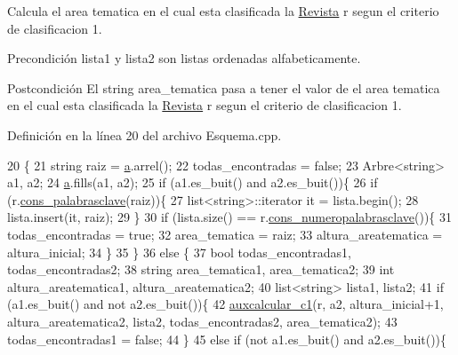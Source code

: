 Calcula el area tematica en el cual esta clasificada la \hyperlink{class_revista}{Revista} r segun el criterio de clasificacion 1. 

\begin{DoxyPrecond}{Precondición}
lista1 y lista2 son listas ordenadas alfabeticamente. 
\end{DoxyPrecond}
\begin{DoxyPostcond}{Postcondición}
El string area\-\_\-tematica pasa a tener el valor de el area tematica en el cual esta clasificada la \hyperlink{class_revista}{Revista} r segun el criterio de clasificacion 1. 
\end{DoxyPostcond}


Definición en la línea 20 del archivo Esquema.\-cpp.


\begin{DoxyCode}
20                                                                                                            
                                                                      \{
21     \textcolor{keywordtype}{string} raiz = \hyperlink{class_esquema_aee89f1d564d1951112b2f10a47f943aa}{a}.arrel();
22     todas\_encontradas = \textcolor{keyword}{false};
23     Arbre<string> a1, a2;
24     \hyperlink{class_esquema_aee89f1d564d1951112b2f10a47f943aa}{a}.fills(a1, a2);
25     \textcolor{keywordflow}{if} (a1.es\_buit() and a2.es\_buit())\{
26   \textcolor{keywordflow}{if} (r.\hyperlink{class_revista_aad8d277011c68f7acdeac6f3d47d28cb}{cons\_palabrasclave}(raiz))\{
27       list<string>::iterator it = lista.begin();
28       lista.insert(it, raiz);
29   \}
30   \textcolor{keywordflow}{if} (lista.size() == r.\hyperlink{class_revista_a69d99a64d3ef987db733b4f492c53db8}{cons\_numeropalabrasclave}())\{
31       todas\_encontradas = \textcolor{keyword}{true};
32       area\_tematica = raiz;
33       altura\_areatematica = altura\_inicial;
34   \}
35     \}
36     \textcolor{keywordflow}{else} \{
37   \textcolor{keywordtype}{bool} todas\_encontradas1, todas\_encontradas2;
38   \textcolor{keywordtype}{string} area\_tematica1, area\_tematica2;
39   \textcolor{keywordtype}{int} altura\_areatematica1, altura\_areatematica2;
40   list<string> lista1, lista2;
41   \textcolor{keywordflow}{if} (a1.es\_buit() and not a2.es\_buit())\{
42       \hyperlink{class_esquema_a77210c8349dc7dccbaa8224c2da4e50e}{auxcalcular\_c1}(r, a2, altura\_inicial+1, altura\_areatematica2, lista2, 
      todas\_encontradas2, area\_tematica2); 
43       todas\_encontradas1 = \textcolor{keyword}{false};
44   \}
45   \textcolor{keywordflow}{else} \textcolor{keywordflow}{if} (not a1.es\_buit() and a2.es\_buit())\{

\end{DoxyCode}
